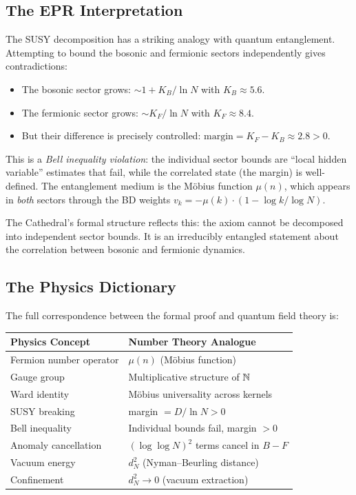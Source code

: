 \documentclass[11pt,a4paper]{article}
\begin{document}
\subsection{The EPR Interpretation}

The SUSY decomposition has a striking analogy with quantum
entanglement. Attempting to bound the bosonic and fermionic
sectors independently gives contradictions:
\begin{itemize}
  \item The bosonic sector grows: $\sim 1 + K_B/\ln N$ with
    $K_B \approx 5.6$.
  \item The fermionic sector grows: $\sim K_F/\ln N$ with
    $K_F \approx 8.4$.
  \item But their difference is precisely controlled:
    $\mathrm{margin} = K_F - K_B \approx 2.8 > 0$.
\end{itemize}
This is a \emph{Bell inequality violation}: the individual
sector bounds are ``local hidden variable'' estimates that fail,
while the correlated state (the margin) is well-defined.
The entanglement medium is the M\"obius function $\mu(n)$, which
appears in \emph{both} sectors through the BD weights
$v_k = -\mu(k) \cdot (1 - \log k/\log N)$.

The Cathedral's formal structure reflects this: the axiom
 cannot be decomposed into
independent sector bounds. It is an irreducibly entangled statement
about the correlation between bosonic and fermionic dynamics.

\subsection{The Physics Dictionary}

The full correspondence between the formal proof and
quantum field theory is:

\begin{center}
\small
\begin{tabular}{@{}ll@{}}
\toprule
\textbf{Physics Concept} & \textbf{Number Theory Analogue} \\
\midrule
Fermion number operator & $\mu(n)$ (M\"obius function) \\
Gauge group & Multiplicative structure of $\mathbb{N}$ \\
Ward identity & M\"obius universality across kernels \\
SUSY breaking & margin $= D/\ln N > 0$ \\
Bell inequality & Individual bounds fail, margin $> 0$ \\
Anomaly cancellation & $(\log\log N)^2$ terms cancel in $B - F$ \\
Vacuum energy & $d_N^2$ (Nyman--Beurling distance) \\
Confinement & $d_N^2 \to 0$ (vacuum extraction) \\
\bottomrule
\end{tabular}
\end{center}
\end{document}
